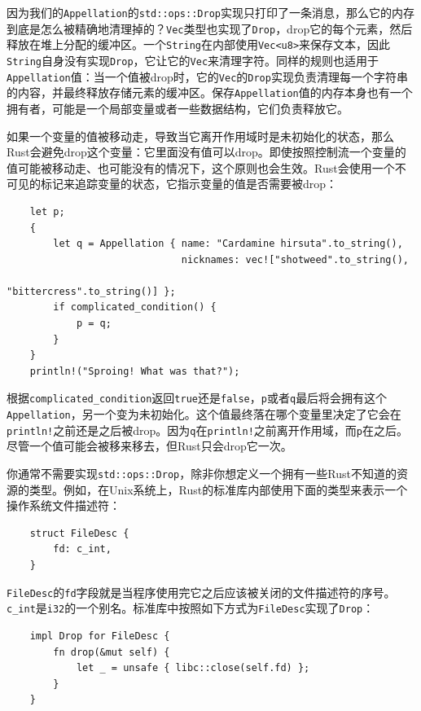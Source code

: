 因为我们的\texttt{Appellation}的\texttt{std::ops::Drop}实现只打印了一条消息，那么它的内存到底是怎么被精确地清理掉的？\texttt{Vec}类型也实现了\texttt{Drop}，drop它的每个元素，然后释放在堆上分配的缓冲区。一个\texttt{String}在内部使用\texttt{Vec<u8>}来保存文本，因此\texttt{String}自身没有实现\texttt{Drop}，它让它的\texttt{Vec}来清理字符。同样的规则也适用于\texttt{Appellation}值：当一个值被drop时，它的\texttt{Vec}的\texttt{Drop}实现负责清理每一个字符串的内容，并最终释放存储元素的缓冲区。保存\texttt{Appellation}值的内存本身也有一个拥有者，可能是一个局部变量或者一些数据结构，它们负责释放它。

如果一个变量的值被移动走，导致当它离开作用域时是未初始化的状态，那么Rust会避免drop这个变量：它里面没有值可以drop。即使按照控制流一个变量的值可能被移动走、也可能没有的情况下，这个原则也会生效。Rust会使用一个不可见的标记来追踪变量的状态，它指示变量的值是否需要被drop：
\begin{verbatim}
    let p;
    {
        let q = Appellation { name: "Cardamine hirsuta".to_string(),
                              nicknames: vec!["shotweed".to_string(),
                                              "bittercress".to_string()] };
        if complicated_condition() {
            p = q;
        }
    }
    println!("Sproing! What was that?");
\end{verbatim}

根据\texttt{complicated\_condition}返回\texttt{true}还是\texttt{false}，\texttt{p}或者\texttt{q}最后将会拥有这个\texttt{Appellation}，另一个变为未初始化。这个值最终落在哪个变量里决定了它会在\texttt{println!}之前还是之后被drop。因为\texttt{q}在\texttt{println!}之前离开作用域，而\texttt{p}在之后。尽管一个值可能会被移来移去，但Rust只会drop它一次。

你通常不需要实现\texttt{std::ops::Drop}，除非你想定义一个拥有一些Rust不知道的资源的类型。例如，在Unix系统上，Rust的标准库内部使用下面的类型来表示一个操作系统文件描述符：
\begin{verbatim}
    struct FileDesc {
        fd: c_int,
    }
\end{verbatim}

\texttt{FileDesc}的\texttt{fd}字段就是当程序使用完它之后应该被关闭的文件描述符的序号。\texttt{c\_int}是\texttt{i32}的一个别名。标准库中按照如下方式为\texttt{FileDesc}实现了\texttt{Drop}：
\begin{verbatim}
    impl Drop for FileDesc {
        fn drop(&mut self) {
            let _ = unsafe { libc::close(self.fd) };
        }
    }
\end{verbatim}

